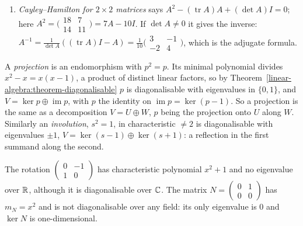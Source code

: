 \begin{example}
\begin{enumerate}
polynomial $x^2 - x - 1$ has the real roots $\varphi = \frac{1 + \sqrt5}2$ and $\psi = \frac{1 - \sqrt5}2$, so $M$ is diagonalisable over $\RR$ and $F_n = a\varphi^n + b\psi^n$ for constants determined by $F_0$
and $F_1$: $a + b = 0$, $a\varphi + b\psi = 1$, so $a = -b = 1/\sqrt5$ and $F_n = (\varphi^n - \psi^n)/\sqrt5$ (Binet's formula). As $|\psi| < 1$, $F_n$ is the integer closest to $\varphi^n/\sqrt5$.
\item \emph{Cayley--Hamilton for $2 \times 2$ matrices} says $A^2 - (\operatorname{tr}A)A + (\det A)I = 0$; here $A^2 = \bigl(\begin{smallmatrix}18 & 7\\ 14 & 11\end{smallmatrix}\bigr) = 7A - 10I$. If $\det A \neq 0$
it gives the inverse: $A^{-1} = \frac{1}{\det A}((\operatorname{tr}A)I - A) = \frac1{10}\bigl(\begin{smallmatrix}3 & -1\\ -2 & 4\end{smallmatrix}\bigr)$, which is the adjugate formula.
\end{enumerate}
\end{example}

\begin{example}\label{linear-algebra:example-projections}
A \emph{projection} is an endomorphism with $p^2 = p$. Its minimal polynomial divides $x^2 - x = x(x - 1)$, a product of distinct linear factors, so by
Theorem~\ref{linear-algebra:theorem-diagonalisable} $p$ is diagonalisable with eigenvalues in $\{0, 1\}$, and $V = \ker p \oplus \operatorname{im}p$, with $p$ the identity on $\operatorname{im}p = \ker(p - 1)$.
So a projection is the same as a decomposition $V = U \oplus W$, $p$ being the projection onto $U$ along $W$. Similarly an \emph{involution}, $s^2 = 1$, in characteristic $\neq 2$ is diagonalisable with
eigenvalues $\pm1$, $V = \ker(s - 1) \oplus \ker(s + 1)$: a reflection in the first summand along the second.
\end{example}

\begin{counterexample}\label{linear-algebra:counterexample-not-diagonalisable}
The rotation $\begin{pmatrix} 0 & -1 \\ 1 & 0 \end{pmatrix}$ has characteristic polynomial $x^2 + 1$ and no eigenvalue
over $\RR$, although it is diagonalisable over $\mathbb{C}$. The matrix
$N = \begin{pmatrix} 0 & 1 \\ 0 & 0 \end{pmatrix}$ has $m_N = x^2$ and is not diagonalisable over any field: its only
eigenvalue is $0$ and $\ker N$ is one-dimensional.
\end{counterexample}

